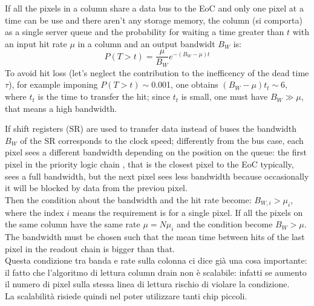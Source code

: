 \begin{titlepage}
If all the pixels in a column share a data bus to the EoC and only one pixel at a time can
be use and there aren't any storage memory, the column (si comporta) as a single
server queue and the probability for waiting a time greater than $t$ with an input
hit rate $\mu$ in a column and an output bandwidt $B_W$ is:
\begin{equation}
P(T > t) = \frac{\mu}{B_W} e^{-( B_W-\mu )t}
\end{equation}
To avoid hit loss (let's neglect the contribution to the inefficency of the dead
time $\tau$), for example imponing $P(T > t)\sim$0.001, one obtains
$(B_W -\mu)t_t\sim$6, where $t_t$ is the time to transfer the hit;
since $t_t$ is small, one must have $B_W \gg \mu$, that means a high bandwidth.

If shift registers (SR) are used to transfer data instead of buses the bandwidth $B_W$
of the SR corresponds to the clock speed; differently from the bus case, each pixel
sees a different bandwidth depending on the position on the queue: the first pixel
in the priority logic chain , that is the closest pixel to the EoC typically,
sees a full bandwidth, but the next pixel sees less bandwidth because
occasionally it will be blocked by data from the previou pixel.\\
Then the condition about the bandwidth and the hit rate become: $B_{W,i} > \mu_{i}$,
where the index $i$ means the requirement is for a single pixel. If all the pixels
on the same column
have the same rate $\mu = N\mu_{i}$ and the condition become $B_{W} > \mu$.
The bandwidth must be chosen such that the mean time between hits of the last pixel
in the readout chain is bigger than that.\\
Questa condizione tra banda e rate sulla colonna ci dice già una cosa importante:
il fatto che l'algoritmo di lettura column drain non è scalabile: infatti se aumento
il numero di pixel sulla stessa linea di lettura rischio di violare la condizione.\\
La scalabilità risiede quindi nel poter utilizzare tanti chip piccoli.\\



\end{titlepage}
